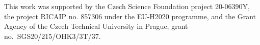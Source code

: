 \documentclass[runningheads]{llncs}
\begin{document}

This work was supported by
the Czech Science Foundation project 20-06390Y,
the project RICAIP no. 857306 under the EU-H2020 programme,
and
the Grant Agency of the Czech Technical University in Prague, grant\\
no.~SGS20/215/OHK3/3T/37.





%
\end{document}
